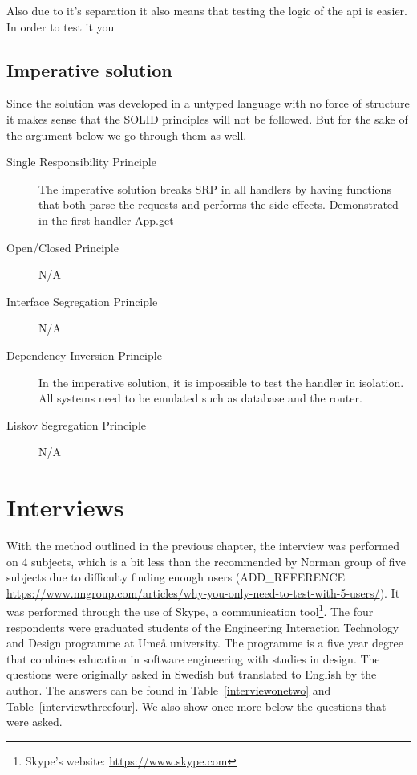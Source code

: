 Also due to it's separation it also means that testing the logic of the api 
is easier. In order to test it you 

\subsection{Imperative solution}

Since the solution was developed in a untyped language with no force of
structure it makes sense that the SOLID principles will not be followed. But
for the sake of the argument below we go through them as well.

\begin{description}
	\item[Single Responsibility Principle] The imperative solution breaks SRP
in all handlers by having functions that both parse the requests and performs
the side effects. Demonstrated in the first handler App.get
	\item[Open/Closed Principle] N/A
	\item[Interface Segregation Principle] N/A
	\item[Dependency Inversion Principle] In the imperative solution, it is 
impossible to test the handler in isolation. All systems need to be emulated
such as database and the router.
	\item[Liskov Segregation Principle] N/A
\end{description}

\section{Interviews}\label{interviews}

With the method outlined in the previous chapter, the interview was performed on
4 subjects, which is a bit less than the recommended by Norman group of
five subjects due to difficulty finding enough users (ADD\_REFERENCE
\url{https://www.nngroup.com/articles/why-you-only-need-to-test-with-5-users/}).
It was performed through the use of Skype, a communication tool\footnote{Skype's
website: \url{https://www.skype.com}}. The four respondents were graduated
students of the Engineering Interaction Technology and Design programme at Umeå
university. The programme is a five year degree that combines education in
software engineering with studies in design. The questions were originally asked
in Swedish but translated to English by the author. The answers can be found in
Table~\ref{interviewonetwo} and Table~\ref{interviewthreefour}. We also show
once more below the questions that were asked.

